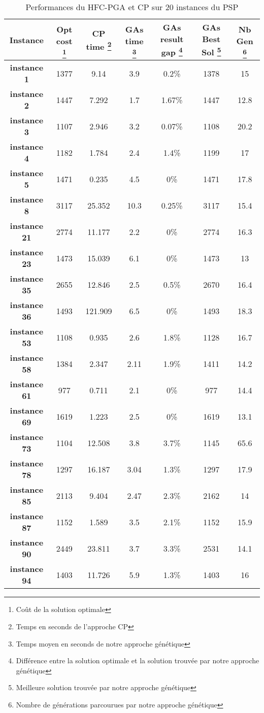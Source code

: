 	\begin{table}[h]
		\centering
		\begin{tabular}{|c|c|c|c|c|c|c|}
			\hline
			\textbf{Instance} & \textbf{Opt cost \footnote{Coût de la solution optimale}} & \textbf{CP time \footnote{Temps en seconds de l'approche CP}} & \textbf{GAs time \footnote{Temps moyen en seconds de notre approche génétique}} & \textbf{GAs result gap \footnote{Différence entre la solution optimale et la solution trouvée par notre approche génétique}} & \textbf{GAs Best Sol \footnote{Meilleure solution trouvée par notre approche génétique}} & \textbf{Nb Gen \footnote{Nombre de générations parcourues par notre approche génétique}}\\
			\hline
			\textbf{instance 1} & 1377 & 9.14 & 3.9 & 0.2\% & 1378 & 15 \\
			\textbf{instance 2} & 1447 & 7.292 & 1.7 & 1.67\% & 1447 & 12.8\\
			\textbf{instance 3} & 1107 & 2.946 & 3.2 & 0.07\% & 1108 & 20.2\\
			\textbf{instance 4} & 1182 & 1.784 & 2.4 & 1.4\% & 1199 & 17\\
			\textbf{instance 5} & 1471 & 0.235 & 4.5 & 0\% & 1471 & 17.8\\
			\textbf{instance 8} & 3117 & 25.352 & 10.3 & 0.25\% & 3117 & 15.4\\
			\textbf{instance 21} & 2774 & 11.177 & 2.2 & 0\% & 2774 & 16.3\\
			\textbf{instance 23} & 1473 & 15.039 & 6.1 & 0\% & 1473 & 13\\
			\textbf{instance 35} & 2655 & 12.846 & 2.5 & 0.5\% & 2670 & 16.4\\
			\textbf{instance 36} & 1493 & 121.909 & 6.5 & 0\% & 1493 & 18.3\\
			\textbf{instance 53} & 1108 & 0.935 & 2.6 & 1.8\% & 1128 & 16.7\\
			\textbf{instance 58} & 1384 & 2.347 & 2.11 & 1.9\% & 1411 & 14.2\\
			\textbf{instance 61} & 977 & 0.711 & 2.1 & 0\% & 977 & 14.4\\
			\textbf{instance 69} & 1619 & 1.223 & 2.5 & 0\% & 1619 & 13.1\\
			\textbf{instance 73} & 1104 & 12.508 & 3.8 & 3.7\% & 1145 & 65.6\\
			\textbf{instance 78} & 1297 & 16.187 & 3.04 & 1.3\% & 1297 & 17.9\\
			\textbf{instance 85} & 2113 & 9.404 & 2.47 & 2.3\% & 2162 & 14\\
			\textbf{instance 87} & 1152 & 1.589 & 3.5 & 2.1\% & 1152 & 15.9\\
			\textbf{instance 90} & 2449 & 23.811 & 3.7 & 3.3\% & 2531 & 14.1\\
			\textbf{instance 94} & 1403 & 11.726 & 5.9 & 1.3\% & 1403 & 16\\
			
			\hline
		\end{tabular}	
		\caption{Performances du HFC-PGA et CP sur 20 instances du PSP}	
		\label{tab:hfc_pga_cp}
	\end{table}			
	
